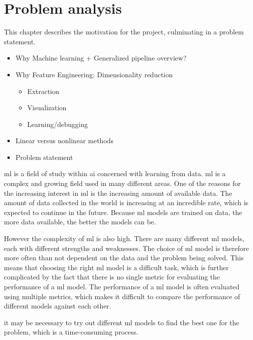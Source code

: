 \chapter{Problem analysis}\label{cha:problem-analysis}
This chapter describes the motivation for the project, culminating in a problem statement.

\begin{itemize}
    \item Why Machine learning + Generalized pipeline overview?
    \item Why Feature Engineering: Dimensionality reduction
          \begin{itemize}
              \item Extraction
              \item Visualization
              \item Learning/debugging
          \end{itemize}
    \item Linear versus nonlinear methods
    \item Problem statement
\end{itemize}

\gls{ml} is a field of study within \gls{ai} concerned with learning from data. \gls{ml} is a complex and growing field used in many different areas. One of the reasons for the increasing interest in \gls{ml} is the increasing amount of available data. The amount of data collected in the world is increasing at an incredible rate, which is expected to continue in the future. Because \gls{ml} models are trained on data, the more data available, the better the models can be.

However the complexity of \gls{ml} is also high. There are many different \gls{ml} models, each with different strengths and weaknesses. The choice of \gls{ml} model is therefore more often than not dependent on the data and the problem being solved. This means that choosing the right \gls{ml} model is a difficult task, which is further complicated by the fact that there is no single metric for evaluating the performance of a \gls{ml} model. The performance of a \gls{ml} model is often evaluated using multiple metrics, which makes it difficult to compare the performance of different models against each other.

it may be necessary to try out different \gls{ml} models to find the best one for the problem, which is a time-consuming process.



